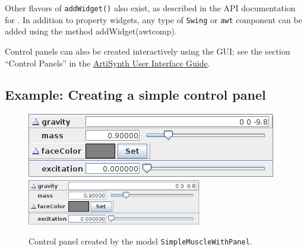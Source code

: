 Other flavors of {\tt addWidget()} also exist, as described in the API
documentation for .  In
addition to property widgets, any type of {\tt Swing} or {\tt awt}
component can be added using the method
%
{addWidget(awtcomp)}.

Control panels can also be created interactively using the GUI; see
the section ``Control Panels'' in the
\href{\artisynthDocBase/html/uiguide/uiguide.html}{
ArtiSynth User Interface Guide}.

\subsection{Example: Creating a simple control panel}

\begin{figure}[t]
\begin{center}
\iflatexml
 \includegraphics[]{images/controlPanel}
\else
 \includegraphics[width=3in]{images/controlPanel}
\fi
\end{center}
\caption{Control panel created by the model {\tt SimpleMuscleWithPanel}.}
\label{controlPanel:fig}
\end{figure}

